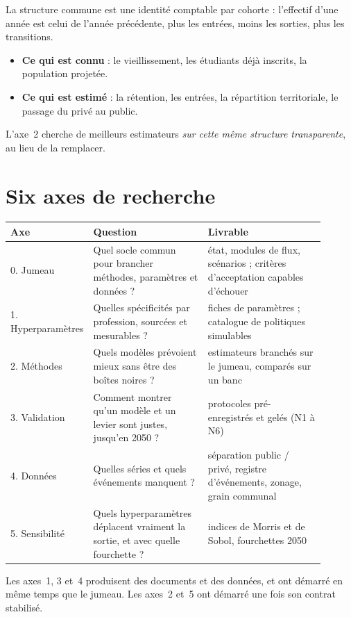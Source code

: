 La structure commune est une identité comptable par cohorte : l'effectif d'une année est celui
de l'année précédente, plus les entrées, moins les sorties, plus les transitions.
\begin{itemize}
  \item \textbf{Ce qui est connu} : le vieillissement, les étudiants déjà inscrits, la
        population projetée.
  \item \textbf{Ce qui est estimé} : la rétention, les entrées, la répartition territoriale,
        le passage du privé au public.
\end{itemize}
L'axe~2 cherche de meilleurs estimateurs \emph{sur cette même structure transparente}, au lieu
de la remplacer.

\section{Six axes de recherche}
\begin{center}
\small
\begin{tabular}{p{0.15\linewidth}p{0.37\linewidth}p{0.38\linewidth}}
\toprule
Axe & Question & Livrable \\
\midrule
0. Jumeau & Quel socle commun pour brancher méthodes, paramètres et données ? & état, modules de flux, scénarios ; critères d'acceptation capables d'échouer \\
1. Hyperparamètres & Quelles spécificités par profession, sourcées et mesurables ? & fiches de paramètres ; catalogue de politiques simulables \\
2. Méthodes & Quels modèles prévoient mieux sans être des boîtes noires ? & estimateurs branchés sur le jumeau, comparés sur un banc \\
3. Validation & Comment montrer qu'un modèle et un levier sont justes, jusqu'en 2050 ? & protocoles pré-enregistrés et gelés (N1 à N6) \\
4. Données & Quelles séries et quels événements manquent ? & séparation public / privé, registre d'événements, zonage, grain communal \\
5. Sensibilité & Quels hyperparamètres déplacent vraiment la sortie, et avec quelle fourchette ? & indices de Morris et de Sobol, fourchettes 2050 \\
\bottomrule
\end{tabular}
\end{center}

Les axes~1, 3 et~4 produisent des documents et des données, et ont démarré en même temps que le
jumeau. Les axes~2 et~5 ont démarré une fois son contrat stabilisé.

